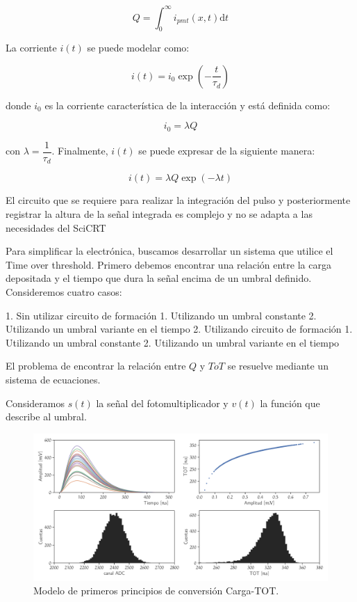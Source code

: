 \begin{equation}
Q=\int_{0}^{\infty} i_{pmt}\left(x,t\right)\mathrm{d}t
\end{equation}

La corriente $i\left(t\right)$ se puede modelar como:

\begin{equation}
i\left(t\right)=i_{0} \exp\left(-\dfrac{t}{\tau_{d}}\right)
\end{equation}

donde $i_{0}$ es la corriente característica de la interacción y está definida como:

\begin{equation}
i_{0}=\lambda Q
\end{equation}

con $\lambda=\dfrac{1}{\tau_{d}}$. Finalmente, $i\left(t\right)$ se puede expresar de la siguiente manera:

\begin{equation}
i\left(t\right)=\lambda Q \exp\left(-\lambda t\right)
\end{equation}

El circuito que se requiere para realizar la integración del pulso y posteriormente registrar la altura de la señal integrada es complejo y no se adapta a las necesidades del SciCRT

Para simplificar la electrónica, buscamos desarrollar un sistema que utilice el Time over threshold. Primero debemos encontrar una relación entre la carga depositada y el tiempo que dura la señal encima de un umbral definido. Consideremos cuatro casos:

1. Sin utilizar circuito de formación
    1. Utilizando un umbral constante
    2. Utilizando un umbral variante en el tiempo
2. Utilizando circuito de formación
    1. Utilizando un umbral constante
    2. Utilizando un umbral variante en el tiempo

El problema de encontrar la relación entre $Q$ y $ToT$ se resuelve mediante un sistema de ecuaciones.

Consideramos $s\left(t\right)$ la señal del fotomultiplicador y $v\left(t\right)$ la función que describe al umbral.

\begin{figure}
        \centering
        \includegraphics[width=\textwidth]{TOT-model.pdf}
        \caption{Modelo de primeros principios de conversión Carga-TOT.}
        \label{fig:tot-model}
\end{figure}

